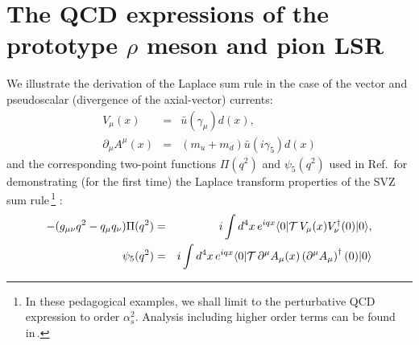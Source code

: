 \documentclass[aps,prd,groupedaddress,nofootinbib]{revtex4-1}
\def\bea{\begin{eqnarray}}
\def\eea{\end{eqnarray}}
\def\nnb{\nonumber}
\def\ga{\left(}
\def\dr{\right)}
\def\nnb{\nonumber}
\def\la{\langle}
\def\ra{\rangle}
\begin{document}
\section{The QCD expressions of the prototype $\rho$ meson and pion LSR}
We illustrate the derivation of the Laplace sum rule in the case of the vector and pseudoscalar (divergence of the axial-vector) currents:
\bea
V_\mu(x)&=&\bar u(\gamma_\mu)d (x),\nnb\\
\partial_\mu A^\mu(x)&=&(m_u+m_d)\bar u(i\gamma_5)d (x)
\eea
and the corresponding two-point functions $\Pi(q^2)$ and $\psi_5(q^2)$ 
used in Ref.\,\cite{SNR} for demonstrating (for the first time) the Laplace transform properties of the SVZ sum rule\,\footnote{In these pedagogical examples, we shall limit to the perturbative QCD expression to order $\alpha_s^2$. Analysis including higher order terms can be found in\,\cite{SNe23,SNLIGHT}.} :
\bea
-(g_{\mu\nu}q^2-q_\mu q_\nu)\Pi(q^2)&=&i\int d^4x\, e^{iqx}\la 0\vert {\cal T}\, V_\mu(x) V^\dagger_\nu(0)\vert  0\ra,\nnb\\
\psi_5(q^2)&=&i\int d^4x\, e^{iqx}\la 0\vert {\cal T}\, \partial^\mu A_\mu(x) \ga\partial^\mu A_\mu\dr^\dagger(0)\vert  0\ra
\eea
\end{document}
